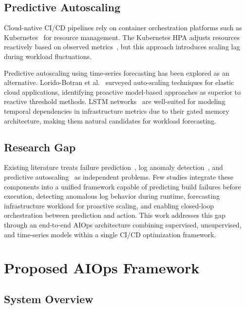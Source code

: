 \documentclass[conference]{IEEEtran}
\begin{document}
\subsection{Predictive Autoscaling}

Cloud-native CI/CD pipelines rely on container orchestration platforms such as Kubernetes~\cite{burns2016borg} for resource management. The Kubernetes HPA adjusts resources reactively based on observed metrics~\cite{kubernetesDocs}, but this approach introduces scaling lag during workload fluctuations.

Predictive autoscaling using time-series forecasting has been explored as an alternative. Lorido-Botran et al.~\cite{lorido2014autoscaling} surveyed auto-scaling techniques for elastic cloud applications, identifying proactive model-based approaches as superior to reactive threshold methods. LSTM networks~\cite{hochreiter1997lstm} are well-suited for modeling temporal dependencies in infrastructure metrics due to their gated memory architecture, making them natural candidates for workload forecasting.

\subsection{Research Gap}

Existing literature treats failure prediction~\cite{chen2016xgboost, rausch2017empirical}, log anomaly detection~\cite{du2017deeplog, le2022log}, and predictive autoscaling~\cite{lorido2014autoscaling} as independent problems. Few studies integrate these components into a unified framework capable of predicting build failures before execution, detecting anomalous log behavior during runtime, forecasting infrastructure workload for proactive scaling, and enabling closed-loop orchestration between prediction and action. This work addresses this gap through an end-to-end AIOps architecture combining supervised, unsupervised, and time-series models within a single CI/CD optimization framework.

\section{Proposed AIOps Framework}

\subsection{System Overview}
\end{document}
